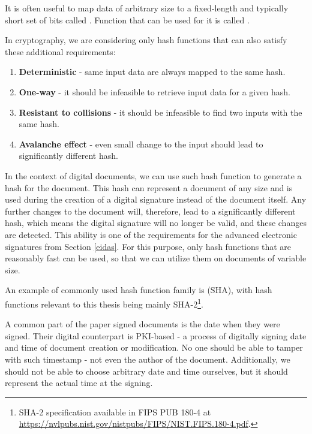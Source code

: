 \documentclass[thesismargins, english, thesislinespacing, onelinechapterstyle, upjsfrontpage]{rnthesis}
\begin{document}
It is often useful to map data of arbitrary size to a fixed-length and typically short set of bits called .
Function that can be used for it is called .

In cryptography, we are considering only hash functions that can also satisfy these additional requirements:

\begin{enumerate}
  \item \textbf{Deterministic} - same input data are always mapped to the same hash.
  \item \textbf{One-way} - it should be infeasible to retrieve input data for a given hash.
  \item \textbf{Resistant to collisions} - it should be infeasible to find two inputs with the same hash.
  \item \textbf{Avalanche effect} - even small change to the input should lead to significantly different hash.
\end{enumerate}

In the context of digital documents, we can use such hash function to generate a hash for the document.
This hash can represent a document of any size and is used during the creation of a digital signature instead of the document itself.
Any further changes to the document will, therefore, lead to a significantly different hash, which means the digital signature will no longer be valid, and these changes are detected.
This ability is one of the requirements for the advanced electronic signatures from Section \ref{eidas}.
For this purpose, only hash functions that are reasonably fast can be used, so that we can utilize them on documents of variable size.

An example of commonly used hash function family is  (SHA), with hash functions relevant to this thesis being mainly SHA-2\footnote{SHA-2 specification available in FIPS PUB 180-4 at \url{https://nvlpubs.nist.gov/nistpubs/FIPS/NIST.FIPS.180-4.pdf}.}.

A common part of the paper signed documents is the date when they were signed.
Their digital counterpart is PKI-based  - a process of digitally signing date and time of document creation or modification.
No one should be able to tamper with such timestamp - not even the author of the document.
Additionally, we should not be able to choose arbitrary date and time ourselves, but it should represent the actual time at the signing.
\end{document}
